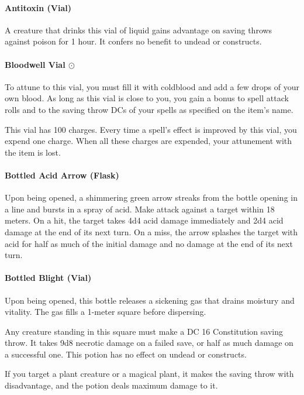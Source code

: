     \paragraph{Antitoxin (Vial)}
        A creature that drinks this vial of liquid gains advantage on saving throws against poison for 1 hour.
        It confers no benefit to undead or constructs.
    \paragraph{Bloodwell Vial $\odot$}
        To attune to this vial, you must fill it with coldblood and add a few drops of your own blood.
        As long as this vial is close to you, you gain a bonus to spell attack rolls and to the saving throw DCs of your spells as specified on the item's name.

        This vial has 100 charges.
        Every time a spell's effect is improved by this vial, you expend one charge.
        When all these charges are expended, your attunement with the item is lost.
    \paragraph{Bottled Acid Arrow (Flask)} %
        Upon being opened, a shimmering green arrow streaks from the bottle opening in a line and bursts in a spray of acid.
        Make attack against a target within 18 meters.
        On a hit, the target takes 4d4 acid damage immediately and 2d4 acid damage at the end of its next turn.
        On a miss, the arrow splashes the target with acid for half as much of the initial damage and no damage at the end of its next turn.
    \paragraph{Bottled Blight (Vial)} %
        Upon being opened, this bottle releases a sickening gas that drains moistury and vitality.
        The gas fills a 1-meter square before dispersing.

        Any creature standing in this square must make a DC 16 Constitution saving throw.
        It takes 9d8 necrotic damage on a failed save, or half as much damage on a successful one.
        This potion has no effect on undead or constructs.

        If you target a plant creature or a magical plant, it makes the saving throw with disadvantage, and the potion deals maximum damage to it.

